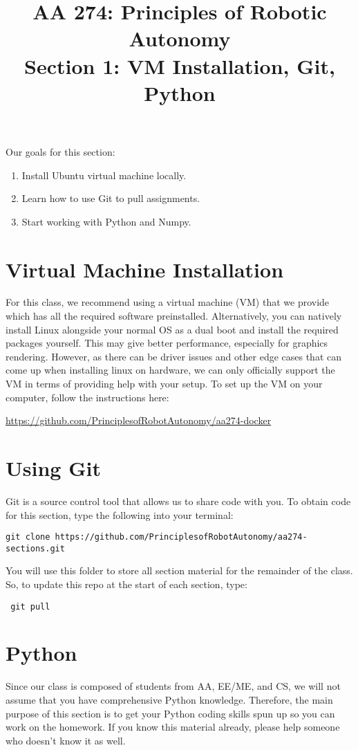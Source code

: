 \documentclass{article}
\title{AA 274: Principles of Robotic Autonomy \\ Section 1: VM Installation, Git, Python}
\date{}
\begin{document}
\maketitle
\pagestyle{fancy}

Our goals for this section: \begin{enumerate}
	\item Install Ubuntu virtual machine locally.
	\item Learn how to use Git to pull assignments.
	\item Start working with Python and Numpy.
\end{enumerate}


\section{Virtual Machine Installation}
For this class, we recommend using a virtual machine (VM) that we provide which has all the
required software preinstalled.
Alternatively, you can natively install Linux alongside your normal OS as a dual boot and install the required
packages yourself. This may give better performance, especially for graphics rendering. However, as there
can be driver issues and other edge cases that can come up when installing linux on hardware, we can only
officially support the VM in terms of providing help with your setup.
To set up the VM on your computer, follow the instructions here: 

\url{https://github.com/PrinciplesofRobotAutonomy/aa274-docker}

\section{Using Git}
Git is a source control tool that allows us to share code with you. To obtain code for this section, type the following into your terminal:

 \begin{lstlisting}[escapechar=|]
 git clone https://github.com/PrinciplesofRobotAutonomy/aa274-sections.git
\end{lstlisting}

You will use this folder to store all section material for the remainder of the class. So, to update this repo at the start of each section, type: 

 \begin{lstlisting}
 git pull
\end{lstlisting}

\section{Python}
Since our class is composed of students from AA, EE/ME, and CS, we will not assume that you have comprehensive Python knowledge. Therefore, the main purpose of this section is to get your Python coding skills spun up so you can work on the homework. If you know this material already, please help someone who doesn't know it as well.
\end{document}
